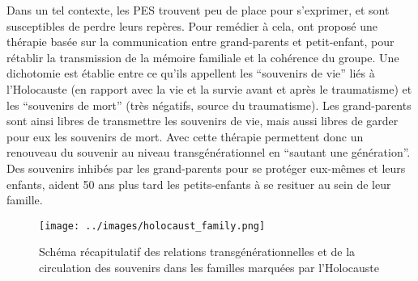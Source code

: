 \documentclass[french]{article}
\begin{document}
			Dans un tel contexte, les PES trouvent peu de place pour s'exprimer, et sont susceptibles de perdre leurs repères. Pour remédier à cela, \cite{fossion2003} ont proposé une thérapie basée sur la communication entre grand-parents et petit-enfant, pour rétablir la transmission de la mémoire familiale et la cohérence du groupe. Une dichotomie est établie entre ce qu'ils appellent les ``souvenirs de vie'' liés à l'Holocauste (en rapport avec la vie et la survie avant et après le traumatisme) et les ``souvenirs de mort'' (très négatifs, source du traumatisme). Les grand-parents sont ainsi libres de transmettre les souvenirs de vie, mais aussi libres de garder pour eux les souvenirs de mort. Avec cette thérapie \cite{fossion2003} permettent donc un renouveau du souvenir au niveau transgénérationnel en ``sautant une génération''. Des souvenirs inhibés par les grand-parents pour se protéger eux-mêmes et leurs enfants, aident 50 ans plus tard les petits-enfants à se resituer au sein de leur famille.
			\begin{figure}[H]
				\centering
				\texttt{[image: ../images/holocaust\_family.png]}
				\caption{Schéma récapitulatif des relations transgénérationnelles et de la circulation des souvenirs dans les familles marquées par l'Holocauste}
			\end{figure}
			
			
			
		
			
\end{document}
